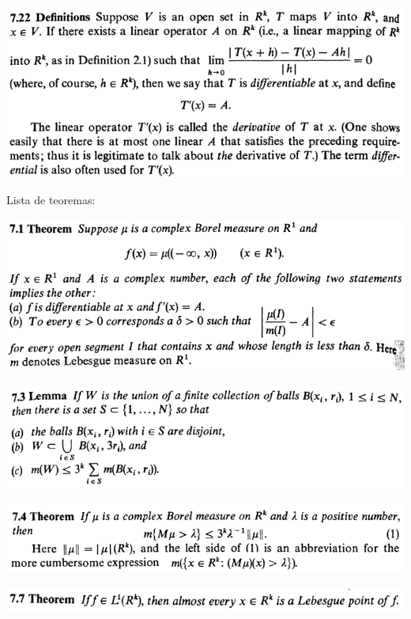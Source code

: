 \documentclass[12pt]{article}
\begin{document}
		\begin{center}
		\includegraphics{d7ponto22}
		\end{center}

Lista de teoremas:

		\begin{center}
		\includegraphics{7ponto1}
		\end{center}

		\begin{center}
		\includegraphics{7ponto3}
		\end{center}

		\begin{center}
		\includegraphics{7ponto4}
		\end{center}

		\begin{center}
		\includegraphics{7ponto7}
		\end{center}
\end{document}
